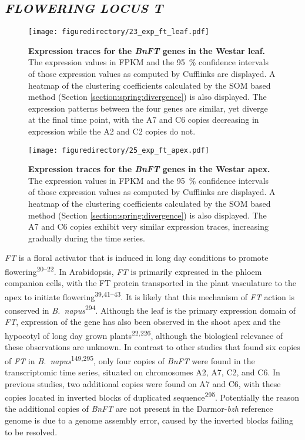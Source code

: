 \documentclass[12pt,]{book}
\begin{document}
\subsection{\texorpdfstring{\emph{FLOWERING LOCUS
T}}{FLOWERING LOCUS T}}\label{section:spring:ft}

\begin{figure}[htbp]
\centering
\texttt{[image: figuredirectory/23\_exp\_ft\_leaf.pdf]}
\caption{\textbf{Expression traces for the \emph{BnFT} genes in the
Westar leaf.} The expression values in FPKM and the 95~\% confidence
intervals of those expression values as computed by Cufflinks are
displayed. A heatmap of the clustering coefficients calculated by the
SOM based method (Section \ref{section:spring:divergence}) is also
displayed. The expression patterns between the four genes are similar,
yet diverge at the final time point, with the A7 and C6 copies
decreasing in expression while the A2 and C2 copies do
not.}\label{figure:223:ftleaf}
\end{figure}

\begin{figure}[htbp]
\centering
\texttt{[image: figuredirectory/25\_exp\_ft\_apex.pdf]}
\caption{\textbf{Expression traces for the \emph{BnFT} genes in the
Westar apex.} The expression values in FPKM and the 95~\% confidence
intervals of those expression values as computed by Cufflinks are
displayed. A heatmap of the clustering coefficients calculated by the
SOM based method (Section \ref{section:spring:divergence}) is also
displayed. The A7 and C6 copies exhibit very similar expression traces,
increasing gradually during the time series.}\label{figure:225:ftapex}
\end{figure}

\emph{FT} is a floral activator that is induced in long day conditions
to promote flowering\textsuperscript{20--22}. In Arabidopsis, \emph{FT}
is primarily expressed in the phloem companion cells, with the FT
protein transported in the plant vasculature to the apex to initiate
flowering\textsuperscript{39,41--43}. It is likely that this mechanism
of \emph{FT} action is conserved in
\emph{B.~napus}\textsuperscript{294}. Although the leaf is the primary
expression domain of \emph{FT}, expression of the gene has also been
observed in the shoot apex and the hypocotyl of long day grown
plants\textsuperscript{22,226}, although the biological relevance of
these observations are unknown. In contrast to other studies that found
six copies of \emph{FT} in \emph{B.~napus}\textsuperscript{149,295},
only four copies of \emph{BnFT} were found in the transcriptomic time
series, situated on chromosomes A2, A7, C2, and C6. In previous studies,
two additional copies were found on A7 and C6, with these copies located
in inverted blocks of duplicated sequence\textsuperscript{295}.
Potentially the reason the additional copies of \emph{BnFT} are not
present in the Darmor-\emph{bzh} reference genome is due to a genome
assembly error, caused by the inverted blocks failing to be resolved.
\end{document}
